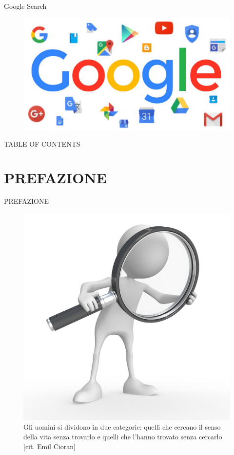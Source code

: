 \documentclass{beamer}
\begin{document}
\begin{frame}{Google Search}
\begin{figure}[h!]
\begin{center}
\includegraphics[width=\linewidth]{immagini/motore-di-ricerca-google.jpg}
\end{center}
\end{figure}
\end{frame}

\begin{frame}{TABLE OF CONTENTS}%
\begin{multicols}{2}
\tableofcontents
\end{multicols}
\end{frame}


\section{PREFAZIONE}
\begin{frame}{PREFAZIONE}
\begin{figure}[h!]
\begin{center}
\includegraphics[width=0.4\linewidth]{immagini/ricerca-felicit.jpg}
\caption{Gli uomini si dividono in due categorie: quelli che cercano il senso della vita senza trovarlo e quelli che l'hanno trovato senza cercarlo [cit. Emil Cioran]}
\end{center}
\end{figure}
\end{frame}
\end{document}

